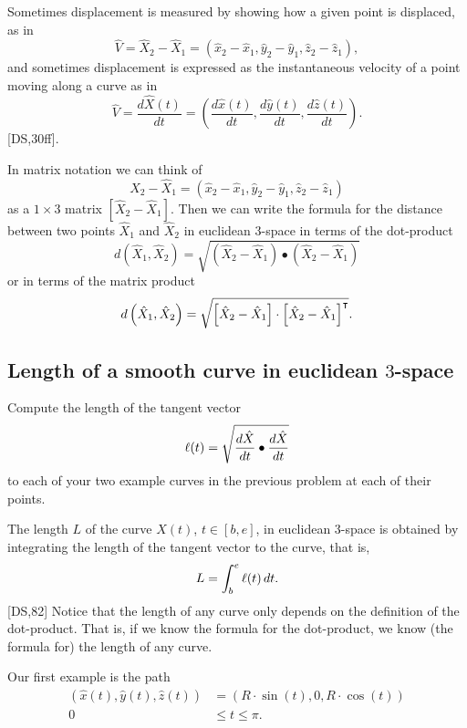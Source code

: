 \documentclass{ximera}
\begin{document}
Sometimes displacement is measured by showing how a given point is displaced,
as in%
\[
\hat{V}=\hat{X}_{2}-\hat{X}_{1}=\left(  \hat{x}_{2}-\hat{x}_{1},\hat{y}%
_{2}-\hat{y}_{1},\hat{z}_{2}-\hat{z}_{1}\right)  ,
\]
and sometimes displacement is expressed as the instantaneous velocity of a
point moving along a curve as in%
\[
\hat{V}=\frac{d\hat{X}\left(  t\right)  }{dt}=\left(  \frac{d\hat{x}\left(
t\right)  }{dt},\frac{d\hat{y}\left(  t\right)  }{dt},\frac{d\hat{z}\left(
t\right)  }{dt}\right)  .
\]
[DS,30ff].

In matrix notation we can think of
\[
\hat{X}_{2}-\hat{X}_{1}=\left(  \hat{x}_{2}-\hat{x}_{1},\hat{y}_{2}-\hat
{y}_{1},\hat{z}_{2}-\hat{z}_{1}\right)
\]
as a $1\times3$ matrix $\left[\hat{X}_{2}-\hat{X}_{1}\right]$. Then we can
write the formula for the distance between two points $\hat{X}_{1}$ and
$\hat{X}_{2}$ in euclidean $3$-space in terms of the dot-product%
\begin{equation}
d\left(  \hat{X}_{1},\hat{X}_{2}\right)  =\sqrt{\left(  \hat{X}_{2}-\hat
{X}_{1}\right)  \bullet\left(  \hat{X}_{2}-\hat{X}_{1}\right)  } \label{13}%
\end{equation}
or in terms of the matrix product%
\[
d\left( \hat{X}_{1},\hat{X}_{2}\right) =\sqrt{\left[
  \hat{X}_{2}-\hat{X}_{1} \right] \cdot\left[\hat{X}_{2}-\hat{X}%
  _{1}\right]^\transpose }.
\]


\subsection*{Length of a smooth curve in euclidean $3$-space}

\begin{problem}
Compute the length of the tangent vector
\[
\l(t)=\sqrt{\frac{d\hat{X}}{dt}\bullet\frac{d\hat{X}}{dt}}%
\]
to each of your two example curves in the previous problem at each of
their points.
\end{problem}

\begin{definition}
The length $L$ of the curve $\hat{X}(t)$, $t\in[b,e] $, in euclidean
$3$-space is obtained by integrating the length of the tangent vector
to the curve, that is,%
\[
L=\int_{b}^{e} \ell(t)  \,dt.
\]
[DS,82] Notice that the length of any curve only depends on the definition of
the dot-product. That is, if we know the formula for the dot-product, we know
(the formula for) the length of any curve.
\end{definition}

Our first example is the path%
\begin{align*}
\left(  \hat{x}\left(  t\right)  ,\hat{y}\left(  t\right)  ,\hat{z}\left(
t\right)  \right)   &  =\left(  R\cdot \sin\left(  t\right)  ,0,R\cdot
\cos\left(  t\right)  \right) \label{6}\\
0\,  &  \leq t\leq\pi.
\end{align*}
\end{document}
